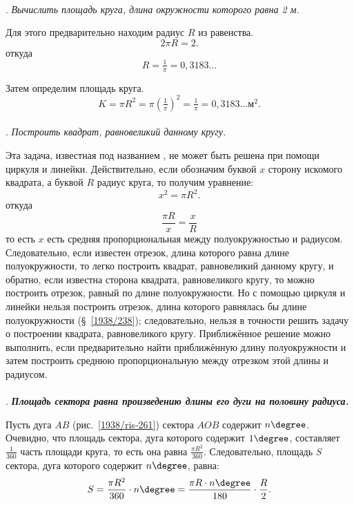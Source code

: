 \paragraph{}\label{1938/266}
.
\emph{Вычислить площадь круга, длина окружности которого равна 2 м.}

Для этого предварительно находим радиус $R$ из равенства.
\[2\pi R= 2.\]
откуда
\[R=\tfrac1\pi=0{,}3183\dots\]

Затем определим площадь круга.
\[K=\pi R^2=\pi(\tfrac1\pi)^2=\tfrac1\pi=0{,}3183\dots\text{м}^2.\]

\paragraph{}\label{1938/267}
.
\emph{Построить квадрат, равновеликий данному кругу.}

Эта задача, известная под названием , не может быть решена при помощи циркуля и линейки.
Действительно, если обозначим буквой $x$ сторону искомого квадрата, а буквой $R$ радиус круга, то получим уравнение:
\[x^2=\pi R^2.\]
откуда
\[\frac{\pi R}{x}=\frac{x}{R}\]
то есть
$x$ есть средняя пропорциональная между полуокружностью и радиусом.
Следовательно, если известен отрезок, длина которого равна длине полуокружности, то легко построить квадрат, равновеликий данному кругу, и обратно, если известна сторона квадрата, равновеликого кругу, то можно построить отрезок, равный по длине полуокружности.
Но с помощью циркуля и линейки нельзя построить отрезок, длина которого равнялась бы длине полуокружности (§~\ref{1938/238});
следовательно, нельзя в точности решить задачу о построении квадрата, равновеликого кругу.
Приближённое решение можно выполнить, если предварительно найти приближённую длину полуокружности и затем построить среднюю пропорциональную между отрезком этой длины и радиусом.

\paragraph{}\label{1938/268}
\mbox{.}
\textbf{\emph{Площадь сектора равна произведению длины его дуги на половину радиуса.}}

Пусть дуга $AB$ (рис.~\ref{1938/ris-261}) сектора $AOB$ содержит $n\degree$.
Очевидно, что площадь сектора, дуга которого содержит $1\degree$, составляет $\tfrac1{360}$ часть площади круга, то есть она равна $\frac{\pi R^2}{360}$.
Следовательно, площадь $S$ сектора, дуга которого содержит $n\degree$, равна:
\[S=\frac{\pi R^2}{360}\cdot n\degree=\frac{\pi R\cdot  n\degree}{180}\cdot \frac R2.\]

